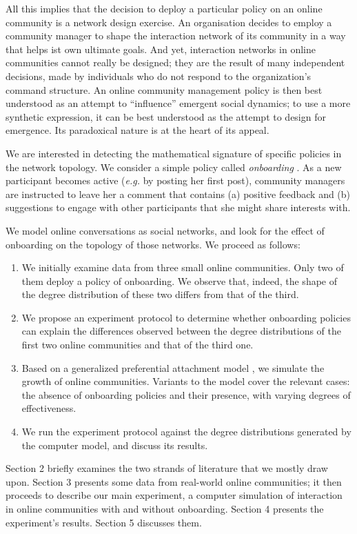 \documentclass{bmcart}
\begin{document}
All this implies that the decision to deploy a particular policy on an online community is a network design exercise. An organisation decides to employ a community manager to shape the interaction network of its community in a way that helps ist own ultimate goals. 
And yet, interaction networks in online communities cannot really be designed; they are the result of many independent decisions, made by individuals who do not respond to the organization's command structure. An online community management policy is then best understood as an attempt to ``influence'' emergent social dynamics; to use a more synthetic expression, it can be best understood as the attempt to design for emergence. Its paradoxical nature is at the heart of its appeal. 

We are interested in detecting the mathematical signature of specific policies in the network topology. 
We consider a simple policy called \emph{onboarding} \cite{rheingold1993virtual} \cite{shirky2008here}. As a new participant becomes active (\emph{e.g.} by posting her first post), community managers are instructed to leave her a comment that contains (a) positive feedback and (b) suggestions to engage with other participants that she might share interests with.

We model online conversations as social networks, and look for the effect of onboarding on the topology of those networks. We proceed as follows:
\begin{enumerate}
\item We initially examine data from three small online communities. Only two of them deploy a policy of onboarding. We observe that, indeed, the shape of the degree distribution of these two differs from that of the third.  
\item We propose an experiment protocol to determine whether onboarding policies can explain the differences observed between the degree distributions of the first two online communities and that of the third one. 
\item Based on a generalized preferential attachment model \cite{dorogovtsev2002evolution}, we simulate the growth of online communities. Variants to the model cover the relevant cases: the absence of onboarding policies and their presence, with varying degrees of effectiveness. 
\item We run the experiment protocol against the degree distributions generated by the computer model, and discuss its results.
\end{enumerate}
Section 2 briefly examines the two strands of literature that we mostly draw upon. Section 3 presents some data from real-world online communities; it then proceeds to describe our main experiment, a computer simulation of interaction in online communities with and without onboarding. Section 4 presents the experiment's results. Section 5 discusses them.
\end{document}
